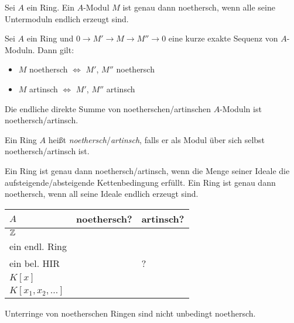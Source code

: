 \documentclass{cheat-sheet}
\newcommand{\cmark}{\ding{51}}
\newcommand{\xmark}{\ding{55}}
\begin{document}
\begin{prop}
  Sei $A$ ein Ring.
  Ein $A$-Modul $M$ ist genau dann noethersch, wenn alle seine Untermoduln endlich erzeugt sind.
\end{prop}

\begin{prop}
  Sei $A$ ein Ring und $0 \to M' \to M \to M'' \to 0$ eine kurze exakte Sequenz von $A$-Moduln.
  Dann gilt:
  \begin{itemize}
    \item $M$ noethersch $\iff$ $M'$, $M''$ noethersch
    \item $M$ artinsch $\iff$ $M'$, $M''$ artinsch
  \end{itemize}
\end{prop}

\begin{kor}
  Die endliche direkte Summe von noetherschen/artinschen $A$-Moduln ist noethersch/artinsch.
\end{kor}


\begin{defn}
  Ein Ring $A$ heißt \emph{noethersch}/\emph{artinsch}, falls er als Modul über sich selbst noethersch/artinsch ist.
\end{defn}

\begin{bem}
  Ein Ring ist genau dann noethersch/artinsch, wenn die Menge seiner Ideale die aufsteigende/absteigende Kettenbedingung erfüllt.
  Ein Ring ist genau dann noethersch, wenn all seine Ideale endlich erzeugt sind.
\end{bem}

\begin{bspe}
  \begin{minipage}[t]{0.88 \linewidth}
    \begin{tabular}[t]{l | l | l}
      $A$ & noethersch? & artinsch? \\ \hline
      $\mathbb{Z}$ & \cmark & \xmark \\
      ein endl. Ring & \cmark & \cmark \\
      ein bel. HIR & \cmark & ? \\
      $K[x]$ & \cmark & \xmark \\
      $K[x_1, x_2, \ldots]$ & \xmark & \xmark
    \end{tabular}
  \end{minipage}
\end{bspe}

\begin{acht}
  Unterringe von noetherschen Ringen sind nicht unbedingt noethersch.
\end{acht}
\end{document}
